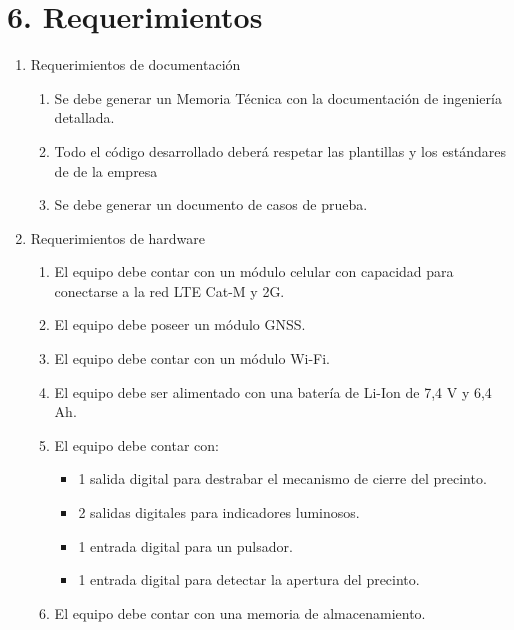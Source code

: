 \documentclass[
11pt, %
]{charter}
\begin{document}
\section{6. Requerimientos}
\label{sec:requerimientos}

\begin{enumerate}
	\item Requerimientos de documentación
		\begin{enumerate}
			\item Se debe generar un Memoria Técnica con la documentación de ingeniería detallada.
			\item Todo el código desarrollado deberá respetar las plantillas y los estándares de
de la empresa \empclientename
			\item Se debe generar un documento de casos de prueba.
		\end{enumerate}

	\item Requerimientos de hardware
		\begin{enumerate}
			\item El equipo debe contar con un módulo celular con capacidad para conectarse a la red LTE Cat-M y 2G.
			\item El equipo debe poseer un módulo GNSS.
			\item El equipo debe contar con un módulo Wi-Fi.
			\item El equipo debe ser alimentado con una batería de Li-Ion de 7,4 V y 6,4 Ah.		
			\item El equipo debe contar con:
			\begin{itemize}
				\item 1 salida digital para destrabar el mecanismo de cierre del precinto. 
				\item 2 salidas digitales para indicadores luminosos.
				\item 1 entrada digital para un pulsador.
				\item 1 entrada digital para detectar la apertura del precinto.
			\end{itemize}
			\item El equipo debe contar con una memoria de almacenamiento.			
		\end{enumerate}
		

\end{enumerate}
\end{document}
